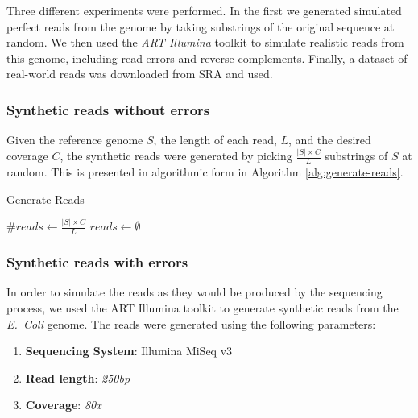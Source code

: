 Three different experiments were performed. In the first we generated simulated perfect reads from the genome by taking substrings of 
the original sequence at random. We then used the \emph{ART Illumina} toolkit  to simulate realistic reads from this
genome, including read errors and reverse complements. Finally, a dataset of real-world reads was downloaded from SRA 
and used.

\subsubsection{Synthetic reads without errors}

Given the reference genome $S$, the length of each read, $L$, and the desired coverage $C$, the synthetic reads were generated by picking
$\frac{|S| \times C}{L}$ substrings of $S$ at random. This is presented in algorithmic form in Algorithm \ref{alg:generate-reads}.

\begin{algorithm}
  \caption{Generate Reads}\label{alg:generate-reads}
  $\mathit{\#reads} \gets \frac{|S| \times C}{L}$\;
  $reads \gets \emptyset$\;
\end{algorithm}

\subsubsection{Synthetic reads with errors}

In order to simulate the reads as they would be produced by the sequencing process, we used the ART Illumina toolkit to generate
synthetic reads from the \emph{E.~Coli} genome. The reads were generated using the following parameters:

\begin{enumerate}
\item \textbf{Sequencing System}: Illumina MiSeq v3
\item \textbf{Read length}: \textit{250bp}
\item \textbf{Coverage}: \textit{80x}
\end{enumerate}